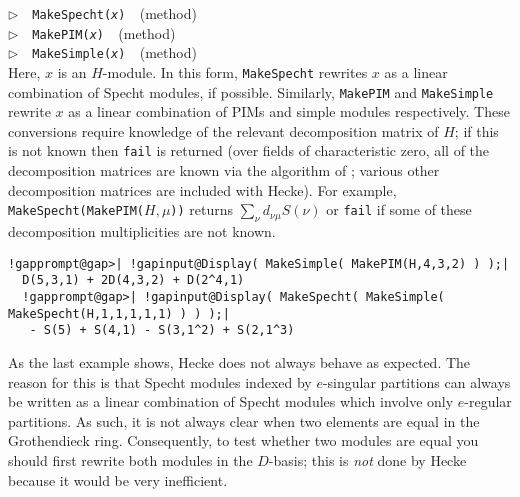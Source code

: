 \documentclass[a4paper,11pt]{report}
\begin{document}
{{{ \noindent\textcolor{FuncColor}{$\triangleright$\ \ \texttt{MakeSpecht({\mdseries\slshape x})
\label{MakeSpecht:for a module}
}\hfill{\scriptsize (method)}}\\
\noindent\textcolor{FuncColor}{$\triangleright$\ \ \texttt{MakePIM({\mdseries\slshape x})
\label{MakePIM:for a module}
}\hfill{\scriptsize (method)}}\\
\noindent\textcolor{FuncColor}{$\triangleright$\ \ \texttt{MakeSimple({\mdseries\slshape x})
\label{MakeSimple:for a module}
}\hfill{\scriptsize (method)}}\\


 Here, $x$ is an $H$-module. In this form, \texttt{MakeSpecht} rewrites $x$ as a linear combination of Specht modules, if possible. Similarly, \texttt{MakePIM} and \texttt{MakeSimple} rewrite $x$ as a linear combination of PIMs and simple modules respectively. These
conversions require knowledge of the relevant decomposition matrix of $H$; if this is not known then \texttt{fail} is returned (over fields of characteristic zero, all of the decomposition
matrices are known via the algorithm of \cite{LLT}; various other decomposition matrices are included with \textsf{Hecke}). For example, \texttt{MakeSpecht(MakePIM(}$H, \mu$\texttt{))} returns $\sum_\nu d_{\nu\mu} S(\nu)$ or \texttt{fail} if some of these decomposition multiplicities are not known. 
\begin{Verbatim}[commandchars=!@|,fontsize=\small,frame=single,label=Example]
  !gapprompt@gap>| !gapinput@Display( MakeSimple( MakePIM(H,4,3,2) ) );|
  D(5,3,1) + 2D(4,3,2) + D(2^4,1)
  !gapprompt@gap>| !gapinput@Display( MakeSpecht( MakeSimple( MakeSpecht(H,1,1,1,1,1) ) ) );|
   - S(5) + S(4,1) - S(3,1^2) + S(2,1^3)
\end{Verbatim}
 As the last example shows, \textsf{Hecke} does not always behave as expected. The reason for this is that Specht modules
indexed by $e$-singular partitions can always be written as a linear combination of Specht
modules which involve only $e$-regular partitions. As such, it is not always clear when two elements are
equal in the Grothendieck ring. Consequently, to test whether two modules are
equal you should first rewrite both modules in the $D$-basis; this is \emph{not} done by \textsf{Hecke} because it would be very inefficient.

}}}
\end{document}
